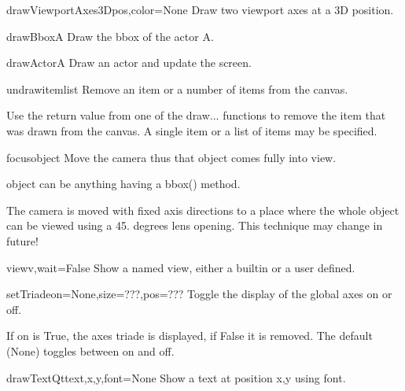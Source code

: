 \begin{funcdesc}{drawViewportAxes3D}{pos,color=None}
Draw two viewport axes at a 3D position.

\end{funcdesc}


\begin{funcdesc}{drawBbox}{A}
Draw the bbox of the actor A.

\end{funcdesc}


\begin{funcdesc}{drawActor}{A}
Draw an actor and update the screen.

\end{funcdesc}


\begin{funcdesc}{undraw}{itemlist}
Remove an item or a number of items from the canvas.

    Use the return value from one of the draw... functions to remove
    the item that was drawn from the canvas.
    A single item or a list of items may be specified.
    

\end{funcdesc}


\begin{funcdesc}{focus}{object}
Move the camera thus that object comes fully into view.

    object can be anything having a bbox() method.

    The camera is moved with fixed axis directions to a place
    where the whole object can be viewed using a 45. degrees lens opening.
    This technique may change in future!
    

\end{funcdesc}


\begin{funcdesc}{view}{v,wait=False}
Show a named view, either a builtin or a user defined.

\end{funcdesc}


\begin{funcdesc}{setTriade}{on=None,size=???,pos=???}
Toggle the display of the global axes on or off.

    If on is True, the axes triade is displayed, if False it is
    removed. The default (None) toggles between on and off.
    

\end{funcdesc}


\begin{funcdesc}{drawTextQt}{text,x,y,font=None}
Show a text at position x,y using font.

\end{funcdesc}


